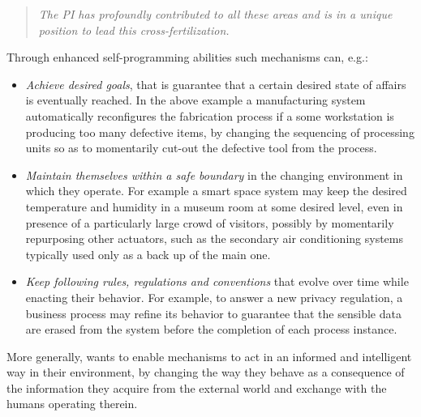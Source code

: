 \begin{quote}{\it
The PI has profoundly contributed to all these areas and is in a unique position to lead this cross-fertilization.}
\end{quote}

 Through enhanced self-programming abilities
 such mechanisms can, e.g.:
\begin{itemize}
\item \emph{Achieve desired goals}, that is guarantee that a certain
  desired state of affairs is eventually reached.  In the above example
  a manufacturing system automatically reconfigures the fabrication
  process if a some workstation is producing too many defective items, by
  changing the sequencing of processing units so as to momentarily
  cut-out the defective tool from the process.
\item \emph{Maintain themselves within a safe boundary} in the
  changing environment in which they operate.  For example a smart
  space system may keep the desired temperature and humidity in a
  museum room at some desired level, even in presence of a
  particularly large crowd of visitors, possibly by momentarily
  repurposing other actuators, such as the secondary air
  conditioning systems typically used only as a back up of the main
  one.
\item \emph{Keep following rules, regulations and
conventions} that evolve over time while enacting their behavior.  
For example, to answer a new privacy regulation, a business process may refine its behavior to guarantee that the sensible data
  are  erased from the system before the completion of each process instance.
\end{itemize}
More generally, \project wants to enable
mechanisms to act in an informed and intelligent way in their
environment, by changing the way they behave as a consequence of the
information they acquire from the external world and exchange
with the humans operating therein.

